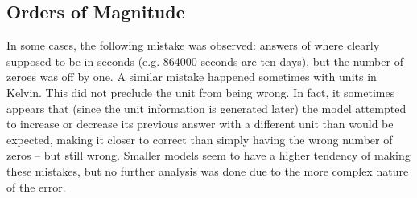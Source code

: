 \subsection{Orders of Magnitude}\label{sub:oom}
In some cases, the following mistake was observed:
answers of \ttime where clearly supposed to be in seconds (e.g. 864000 seconds are ten days), but the number of zeroes was off by one.
A similar mistake happened sometimes with \ttemp units in Kelvin.
This did not preclude the unit from being wrong.
In fact, it sometimes appears that (since the unit information is generated later) the model attempted to increase or decrease its previous answer with a different unit than would be expected, making it closer to correct than simply having the wrong number of zeros -- but still wrong.
Smaller models seem to have a higher tendency of making these mistakes, but no further analysis was done due to the more complex nature of the error.



%
%
%


